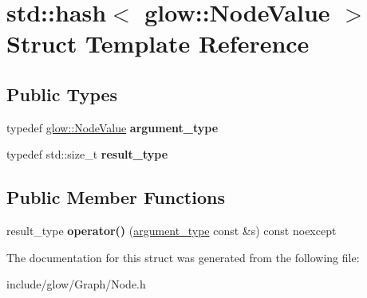 \hypertarget{structstd_1_1hash_3_01glow_1_1_node_value_01_4}{}\section{std\+:\+:hash$<$ glow\+:\+:Node\+Value $>$ Struct Template Reference}
\label{structstd_1_1hash_3_01glow_1_1_node_value_01_4}
\subsection*{Public Types}
\begin{DoxyCompactItemize}
\item 
\mbox{\label{structstd_1_1hash_3_01glow_1_1_node_value_01_4_a94bc4057ac70fcc2075b5b75325e9c6e}} 
typedef \hyperlink{structglow_1_1_node_value}{glow\+::\+Node\+Value} {\bfseries argument\+\_\+type}
\item 
\mbox{\label{structstd_1_1hash_3_01glow_1_1_node_value_01_4_a56ca176beede4a3f68fb6d6b4e44b40a}} 
typedef std\+::size\+\_\+t {\bfseries result\+\_\+type}
\end{DoxyCompactItemize}
\subsection*{Public Member Functions}
\begin{DoxyCompactItemize}
\item 
\mbox{\label{structstd_1_1hash_3_01glow_1_1_node_value_01_4_a1f1d8a6e6cf06812d1d564640bd7bb8d}} 
result\+\_\+type {\bfseries operator()} (\hyperlink{structglow_1_1_node_value}{argument\+\_\+type} const \&s) const noexcept
\end{DoxyCompactItemize}


The documentation for this struct was generated from the following file\+:\begin{DoxyCompactItemize}
\item 
include/glow/\+Graph/Node.\+h\end{DoxyCompactItemize}
